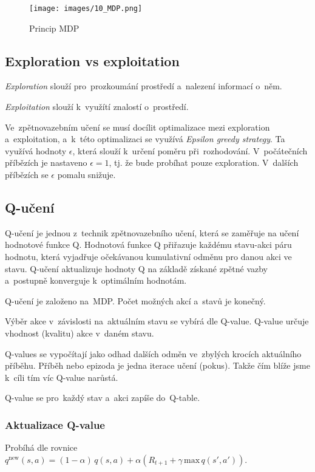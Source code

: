 \begin{figure}[h]
    \centering
    \texttt{[image: images/10\_MDP.png]}
    \caption{Princip MDP}
    \label{mdp}
\end{figure}

\subsection{Exploration vs exploitation}

\emph{Exploration} slouží pro~prozkoumání prostředí a~nalezení informací o~něm.

\emph{Exploitation} slouží k~využítí znalostí o~prostředí.

Ve~zpětnovazebním učení se musí docílit optimalizace mezi exploration a~exploitation, a~k~této optimalizaci se využívá \emph{Epsilon greedy strategy}.
Ta využívá hodnoty $\epsilon$, která slouží k~určení poměru při~rozhodování.
V~počátečních příbězích je nastaveno $\epsilon = 1$, tj. že bude probíhat pouze exploration.
V~dalších příbězích se $\epsilon$ pomalu snižuje.

\subsection{Q-učení}

Q-učení je jednou z~technik zpětnovazebního učení, která se zaměřuje na učení hodnotové funkce Q. Hodnotová funkce Q přiřazuje každému stavu-akci páru hodnotu, která vyjadřuje očekávanou kumulativní odměnu pro danou akci ve stavu. Q-učení aktualizuje hodnoty Q na základě získané zpětné vazby a~postupně konverguje k~optimálním hodnotám.

Q-učení je založeno na~MDP.
Počet možných akcí a~stavů je konečný.

Výběr akce v~závislosti na~aktuálním stavu se vybírá dle Q-value.
Q-value určuje vhodnost (kvalitu) akce v~daném stavu.

Q-values se vypočítají jako odhad dalších odměn ve~zbylých krocích aktuálního příběhu.
Příběh nebo epizoda je jedna iterace učení (pokus).
Takže čím blíže jsme k~cíli tím víc Q-value narůstá.

Q-value se pro~každý stav a~akci zapíše do~Q-table.

\subsubsection{Aktualizace Q-value}

Probíhá dle rovnice
$q^\text{new}(s,a) = (1-\alpha)\, q(s,a) + \alpha \left(R_{t+1} + \gamma\,\text{max}\,q(s',a')\right)$.

